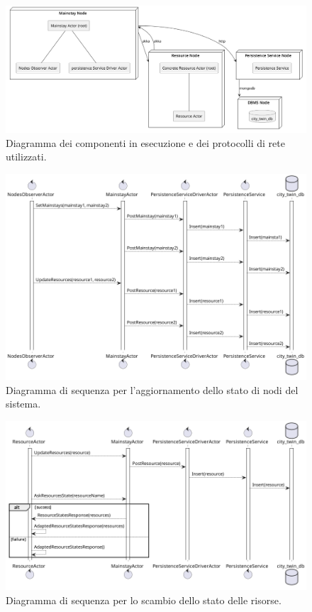 \documentclass[12pt]{article}
\begin{document}
\begin{figure}[h]
    \caption{Diagramma dei componenti in esecuzione e dei protocolli di rete utilizzati.}
    \includegraphics[width=\textwidth]{../assets/images/nodes-component-diagram.png}
\end{figure}

\begin{figure}[h]
    \caption{Diagramma di sequenza per l'aggiornamento dello stato di nodi del sistema.}
    \includegraphics[width=\textwidth]{../assets/images/core-nodes-state-sequence-diagram.png}
\end{figure}

\begin{figure}[h]
    \caption{Diagramma di sequenza per lo scambio dello stato delle risorse.}
    \includegraphics[width=\textwidth]{../assets/images/core-resource-state-exchange-sequence-diagram.png}
\end{figure}
\end{document}
